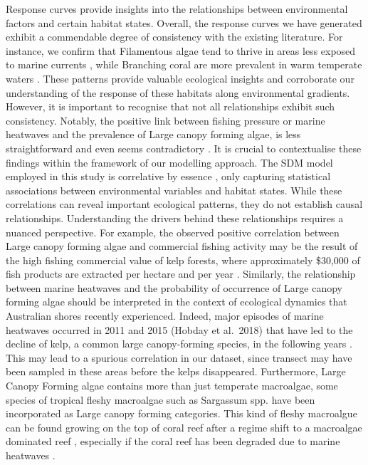 \begin{refsection}
Response curves provide insights into the relationships between
environmental factors and certain habitat states. Overall, the response
curves we have generated exhibit a commendable degree of consistency
with the existing literature. For instance, we confirm that Filamentous
algae tend to thrive in areas less exposed to marine currents
\autocite{Quintano_2015}, while Branching coral are more prevalent in
warm temperate waters \autocite{Higuchi_2015}. These patterns provide
valuable ecological insights and corroborate our understanding of the
response of these habitats along environmental gradients. However, it is
important to recognise that not all relationships exhibit such
consistency. Notably, the positive link between fishing pressure or
marine heatwaves and the prevalence of Large canopy forming algae, is
less straightforward and even seems contradictory
\autocite{Wernberg_2016}. It is crucial to contextualise these findings
within the framework of our modelling approach. The SDM model employed
in this study is correlative by essence \autocite{Shabani_2016}, only
capturing statistical associations between environmental variables and
habitat states. While these correlations can reveal important ecological
patterns, they do not establish causal relationships. Understanding the
drivers behind these relationships requires a nuanced perspective. For
example, the observed positive correlation between Large canopy forming
algae and commercial fishing activity may be the result of the high
fishing commercial value of kelp forests, where approximately \$30,000
of fish products are extracted per hectare and per year
\autocite{Eger_2023}. Similarly, the relationship between marine
heatwaves and the probability of occurrence of Large canopy forming
algae should be interpreted in the context of ecological dynamics that
Australian shores recently experienced. Indeed, major episodes of marine
heatwaves occurred in 2011 and 2015 (Hobday et al.~2018) that have led
to the decline of kelp, a common large canopy-forming species, in the
following years \autocite{Wernberg_2016}. This may lead to a spurious
correlation in our dataset, since transect may have been sampled in
these areas before the kelps disappeared. Furthermore, Large Canopy
Forming algae contains more than just temperate macroalgae, some species
of tropical fleshy macroalgae such as Sargassum spp. have been
incorporated as Large canopy forming categories. This kind of fleshy
macroalgue can be found growing on the top of coral reef after a regime
shift to a macroalgae dominated reef \autocite{Smith_2022}, especially
if the coral reef has been degraded due to marine heatwaves
\autocite{Donovan_2021}.


\end{refsection}
